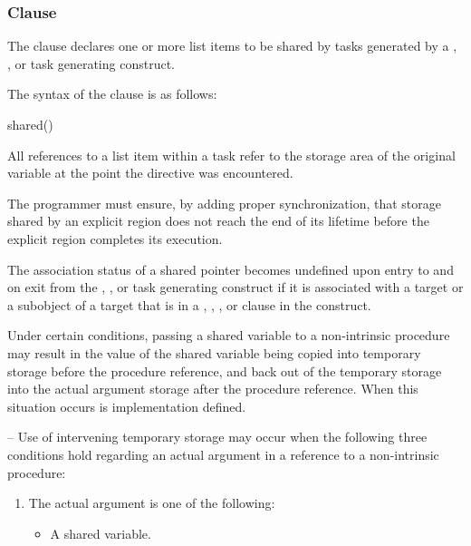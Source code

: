 {{{{\subsubsection{ Clause}
\label{subsubsec:shared clause}
\summary
The  clause declares one or more list items to be shared by tasks generated by 
a , , or task generating construct.

\syntax
The syntax of the  clause is as follows:

\begin{boxedcode}
shared()
\end{boxedcode}

\descr
All references to a list item within a task refer to the storage area of the original variable 
at the point the directive was encountered. 

The programmer must ensure, by adding proper synchronization, that 
storage shared by an explicit  region does not reach the end of its lifetime before 
the explicit  region completes its execution. 

\fortranspecificstart
The association status of a shared pointer becomes undefined upon entry to and on exit 
from the , , or task generating construct if it
is associated with a target or a  subobject of a target that is in a ,
, , or  clause in the construct.

Under certain conditions, passing a shared variable to a non-intrinsic procedure may 
result in the value of the shared variable being copied into temporary storage before the 
procedure reference, and back out of the temporary storage into the actual argument 
storage after the procedure reference. When this situation occurs is implementation defined.

\notestart
\noteheader – Use of intervening temporary storage may occur when the following three 
conditions hold regarding an actual argument in a reference to a non-intrinsic procedure:

\begin{enumerate}%
\item The actual argument is one of the following:

\begin{itemize} %
\item A shared variable.


\end{itemize}
\end{enumerate}}}}}
